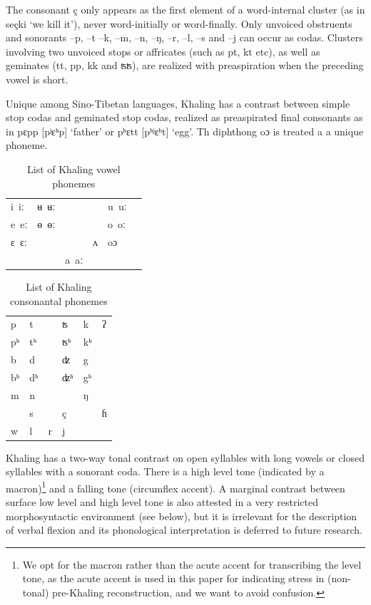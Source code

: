 \documentclass[oldfontcommands,oneside,a4paper,11pt]{article}
\newcommand{\ipa}[1]{{\phon \mbox{#1}}} %
\begin{document}
The consonant \ipa{ç} only appears as the first element of a word-internal cluster (as in \ipa{seçki} `we kill it'), never word-initially or word-finally. Only unvoiced obstruents and sonorants \ipa{--p}, \ipa{--t} \ipa{--k}, \ipa{--m}, \ipa{--n}, \ipa{--ŋ}, \ipa{--r}, \ipa{--l}, \ipa{--s} and \ipa{--j} can occur as codas. Clusters involving two unvoiced stops or affricates (such as \ipa{pt}, \ipa{kt} etc), as well as geminates (\ipa{tt}, \ipa{pp}, \ipa{kk} and \ipa{ʦʦ}), are realized with preaspiration when the preceding vowel is short.

Unique among Sino-Tibetan languages, Khaling has a contrast between simple stop codas and geminated stop codas, realized as preaspirated final consonants as in \ipa{pɛpp} [pʲɛʰp] `father'  or \ipa{pʰɛtt} [pʰʲɛʰt] `egg'. Th diphthong \ipa{oɔ} is treated a a unique phoneme.

\begin{table}[H]
\caption{List of Khaling vowel phonemes} \label{tab:vowels}\centering
\begin{tabular}{llllll}
\ipa{i iː} & \ipa{ʉ ʉː} & &&\ipa{u uː} \\
\ipa{e eː} & \ipa{ɵ ɵː} & &&\ipa{o oː} \\
\ipa{ɛ ɛː} &   & &\ipa{ʌ} &  \ipa{oɔ} \\
&&\ipa{a aː}\\
\end{tabular}
\end{table}

\begin{table}[H]
\caption{List of Khaling consonantal phonemes} \label{tab:consonants}\centering
\begin{tabular}{llllll}
\ipa{p} & \ipa{t} &&\ipa{ʦ}  & \ipa{k}&\ipa{ʔ}\\
\ipa{pʰ} & \ipa{tʰ} &&\ipa{ʦʰ}  & \ipa{kʰ}&\\
\ipa{b} & \ipa{d} &&\ipa{ʣ}  & \ipa{g}&\\
\ipa{bʰ} & \ipa{dʰ} &&\ipa{ʣʰ}  & \ipa{gʰ}&\\
\ipa{m} & \ipa{n} && & \ipa{ŋ}&\\
  & \ipa{s} && \ipa{ç}& &\ipa{ɦ}\\
  \ipa{w} & \ipa{l} &\ipa{r}&\ipa{j}  & &\\
\end{tabular}
\end{table}

Khaling has a two-way tonal contrast on open syllables with long vowels or closed syllables with a sonorant coda. There is a high level tone (indicated by a macron)\footnote{We opt for the macron rather than the acute accent for transcribing the level tone, as the acute accent is used in this paper for indicating stress in (non-tonal) pre-Khaling reconstruction, and we want to avoid confusion.} and a falling tone (circumflex accent). A marginal contrast between surface low level and high level tone is also attested in a very restricted morphosyntactic environment (see below), but it is irrelevant for the description of verbal flexion and its phonological interpretation is deferred to future research.
\end{document}
